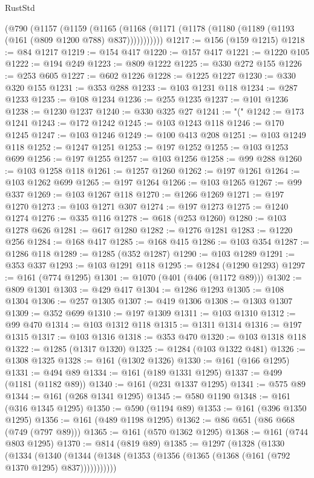 \begin{lexlean}{RustStd}
\begin{coremodule}
    (@790
      (@1157
        (@1159
          (@1165 (@1168 (@1171 (@1178 (@1180 (@1189 (@1193 (@161 (@809 @1200 @788) @837)))))))))))
@1217 := @156 (@159 @1215)
@1218 := @84 @1217
@1219 := @154 @417
@1220 := @157 @417
@1221 := @1220 @105
@1222 := @194 @249
@1223 := @809 @1222
@1225 := @330 @272 @155
@1226 := @253 @605
@1227 := @602 @1226
@1228 := @1225 @1227
@1230 := @330 @320 @155
@1231 := @353 @288
@1233 := @103 @1231 @118
@1234 := @287 @1233
@1235 := @108 @1234
@1236 := @255 @1235
@1237 := @101 @1236
@1238 := @1230 @1237
@1240 := @330 @325 @27
@1241 := "("
@1242 := @173 @1241
@1243 := @172 @1242
@1245 := @103 @1243 @118
@1246 := @170 @1245
@1247 := @103 @1246
@1249 := @100 @413 @208
@1251 := @103 @1249 @118
@1252 := @1247 @1251
@1253 := @197 @1252
@1255 := @103 @1253 @699
@1256 := @197 @1255
@1257 := @103 @1256
@1258 := @99 @288
@1260 := @103 @1258 @118
@1261 := @1257 @1260
@1262 := @197 @1261
@1264 := @103 @1262 @699
@1265 := @197 @1264
@1266 := @103 @1265
@1267 := @99 @337
@1269 := @103 @1267 @118
@1270 := @1266 @1269
@1271 := @197 @1270
@1273 := @103 @1271 @307
@1274 := @197 @1273
@1275 := @1240 @1274
@1276 := @335 @116
@1278 := @618 (@253 @1260)
@1280 := @103 @1278 @626
@1281 := @617 @1280
@1282 := @1276 @1281
@1283 := @1220 @256
@1284 := @168 @417
@1285 := @168 @415
@1286 := @103 @354
@1287 := @1286 @118
@1289 := @1285 (@352 @1287)
@1290 := @103 @1289
@1291 := @353 @337
@1293 := @103 @1291 @118
@1295 := @1284 (@1290 @1293)
@1297 := @161 (@774 @1295)
@1301 := @1070 (@401 (@406 (@1172 @89)))
@1302 := @809 @1301
@1303 := @429 @417
@1304 := @1286 @1293
@1305 := @108 @1304
@1306 := @257 @1305
@1307 := @419 @1306
@1308 := @1303 @1307
@1309 := @352 @699
@1310 := @197 @1309
@1311 := @103 @1310
@1312 := @99 @470
@1314 := @103 @1312 @118
@1315 := @1311 @1314
@1316 := @197 @1315
@1317 := @103 @1316
@1318 := @353 @470
@1320 := @103 @1318 @118
@1322 := @1285 (@1317 @1320)
@1325 := @1284 (@103 @1322 @481)
@1326 := @1308 @1325
@1328 := @161 (@1302 @1326)
@1330 := @161 (@166 @1295)
@1331 := @494 @89
@1334 := @161 (@189 @1331 @1295)
@1337 := @499 (@1181 (@1182 @89))
@1340 := @161 (@231 @1337 @1295)
@1341 := @575 @89
@1344 := @161 (@268 @1341 @1295)
@1345 := @580 @1190
@1348 := @161 (@316 @1345 @1295)
@1350 := @590 (@1194 @89)
@1353 := @161 (@396 @1350 @1295)
@1356 := @161 (@489 @1198 @1295)
@1362 := @86 @651 (@86 @668 (@749 (@797 @89)))
@1365 := @161 (@570 @1362 @1295)
@1368 := @161 (@744 @803 @1295)
@1370 := @814 (@819 @89)
@1385 := @1297
    (@1328
      (@1330
        (@1334
          (@1340 (@1344 (@1348 (@1353 (@1356 (@1365 (@1368 (@161 (@792 @1370 @1295) @837)))))))))))

\end{coremodule}
\end{lexlean}
